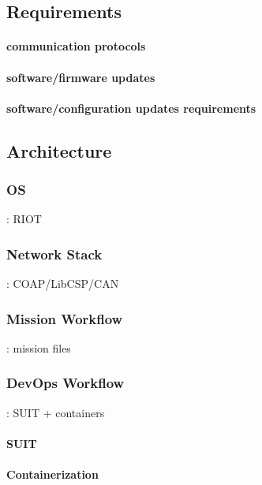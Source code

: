 \subsection{Requirements}

\paragraph*{communication protocols}
\paragraph*{software/firmware updates}
\paragraph*{software/configuration updates requirements}

\subsection{Architecture}
\subsubsection{OS}: RIOT
\subsubsection{Network Stack}: COAP/LibCSP/CAN
\subsubsection{Mission Workflow}: mission files
\subsubsection{DevOps Workflow}: SUIT + containers
\paragraph*{SUIT}
\paragraph*{Containerization}

